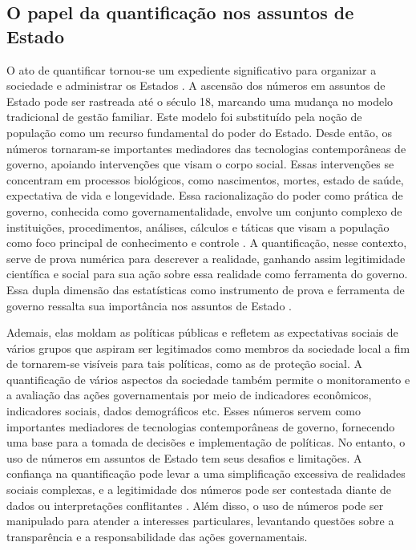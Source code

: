\subsection{O papel da quantificação nos assuntos de Estado}

O ato de quantificar tornou-se um expediente significativo para organizar a sociedade e administrar os Estados \cite{desrosieres1998politics}. A ascensão dos números em assuntos de Estado pode ser rastreada até o século 18, marcando uma mudança no modelo tradicional de gestão familiar. Este modelo foi substituído pela noção de população como um recurso fundamental do poder do Estado. Desde então, os números tornaram-se importantes mediadores das tecnologias contemporâneas de governo, apoiando intervenções que visam o corpo social. Essas intervenções se concentram em processos biológicos, como nascimentos, mortes, estado de saúde, expectativa de vida e longevidade. Essa racionalização do poder como prática de governo, conhecida como governamentalidade, envolve um conjunto complexo de instituições, procedimentos, análises, cálculos e táticas que visam a população como foco principal de conhecimento e controle \cite{diaz2016convention}. A quantificação, nesse contexto, serve de prova numérica para descrever a realidade, ganhando assim legitimidade científica e social para sua ação sobre essa realidade como ferramenta do governo. Essa dupla dimensão das estatísticas como instrumento de prova e ferramenta de governo ressalta sua importância nos assuntos de Estado \cite{bruno2014statactivism}.

Ademais, elas moldam as políticas públicas e refletem as expectativas sociais de vários grupos que aspiram ser legitimados como membros da sociedade local a fim de tornarem-se visíveis para tais políticas, como as de proteção social. A quantificação de vários aspectos da sociedade também permite o monitoramento e a avaliação das ações governamentais por meio de indicadores econômicos, indicadores sociais, dados demográficos etc. Esses números servem como importantes mediadores de tecnologias contemporâneas de governo, fornecendo uma base para a tomada de decisões e implementação de políticas. No entanto, o uso de números em assuntos de Estado tem seus desafios e limitações. A confiança na quantificação pode levar a uma simplificação excessiva de realidades sociais complexas, e a legitimidade dos números pode ser contestada diante de dados ou interpretações conflitantes \cite{camargo2021social}. Além disso, o uso de números pode ser manipulado para atender a interesses particulares, levantando questões sobre a transparência e a responsabilidade das ações governamentais. 

